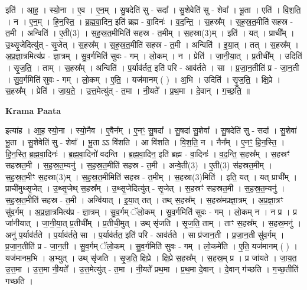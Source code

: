 \documentclass[17pt]{extarticle}
\begin{document}
इति॑ । आ॒ह॒ । स्यो॒ना । ए॒व । ए॒न॒म् । सु॒षदेति॑ सु - सदा᳚ । सु॒शेवेति॑ सु - शेवा᳚ । भू॒ता । एति॑ । वि॒श॒ति॒ । न । ए॒न॒म् । हि॒न॒स्ति॒ । ब्र॒ह्म॒वा॒दिन॒ इति॑ ब्रह्म - वा॒दिनः॑ । व॒द॒न्ति॒ । स॒हस्र᳚म् । स॒ह॒स्र॒त॒मीति॑ सहस्र - त॒मी । अन्विति॑ । ए॒ती(3) । स॒ह॒स्र॒त॒मीमिति॑ सहस्र - त॒मीम् । स॒हस्रा(3)म् । इति॑ । यत् । प्राची᳚म् । उ॒थ्सृ॒जेदित्यु॑त् - सृ॒जेत् । स॒हस्र᳚म् । स॒ह॒स्र॒त॒मीति॑ सहस्र - त॒मी । अन्विति॑ । इ॒या॒त् । तत् । स॒हस्र᳚म् । अ॒प्र॒ज्ञा॒त्रमित्य॑प्र - ज्ञा॒त्रम् । सु॒व॒र्गमिति॑ सुवः - गम् । लो॒कम् । न । प्रेति॑ । जा॒नी॒या॒त् । प्र॒तीची᳚म् । उदिति॑ । सृ॒ज॒ति॒ । ताम् । स॒हस्र᳚म् । अन्विति॑ । प॒र्याव॑र्तत॒ इति॑ परि - आव॑र्तते । सा । प्र॒जा॒न॒तीति॑ प्र - जा॒न॒ती । सु॒व॒र्गमिति॑ सुवः - गम् । लो॒कम् । ए॒ति॒ । यज॑मानम् ( ) । अ॒भि । उदिति॑ । सृ॒ज॒ति॒ । क्षि॒प्रे । स॒हस्र᳚म् । प्रेति॑ । जा॒य॒ते॒ । उ॒त्त॒मेत्यु॑त् - त॒मा । नी॒यते᳚ । प्र॒थ॒मा । दे॒वान् । ग॒च्छ॒ति॒ ॥  \newline


\textbf{Krama Paata} \newline

इत्या॑ह । आ॒ह॒ स्यो॒ना । स्यो॒नैव । ए॒वैन᳚म् । ए॒नꣳ॒॒ सु॒षदा᳚ । सु॒षदा॑ सु॒शेवा᳚ । सु॒षदेति॑ सु - सदा᳚ । सु॒शेवा॑ भू॒ता । सु॒शेवेति॑ सु - शेवा᳚ । भू॒ता ऽऽ वि॑शति । आ वि॑शति । वि॒श॒ति॒ न । नैन᳚म् । ए॒नꣳ॒॒ हि॒न॒स्ति॒ । हि॒न॒स्ति॒ ब्र॒ह्म॒वा॒दिनः॑ । ब्र॒ह्म॒वा॒दिनो॑ वदन्ति । ब्र॒ह्म॒वा॒दिन॒ इति॑ ब्रह्म - वा॒दिनः॑ । व॒द॒न्ति॒ स॒हस्र᳚म् । स॒हस्रꣳ॑ सहस्रत॒मी । स॒ह॒स्र॒त॒म्यनु॑ । स॒ह॒स्र॒त॒मीति॑ सहस्र - त॒मी । अन्वे॒ती(3) । ए॒ती(3) स॑हस्रत॒मीम् । स॒ह॒स्र॒त॒मीꣳ स॒हस्रा(3)म् । स॒ह॒स्र॒त॒मीमिति॑ सहस्र - त॒मीम् । स॒हस्रा(3)मिति॑ । इति॒ यत् । यत् प्राची᳚म् । प्राची॑मुथ्सृ॒जेत् । उ॒थ्सृ॒जेथ् स॒हस्र᳚म् । उ॒थ्सृ॒जेदित्यु॑त् - सृ॒जेत् । स॒हस्रꣳ॑ सहस्रत॒मी । स॒ह॒स्र॒त॒म्यनु॑ । स॒ह॒स्र॒त॒मीति॑ सहस्र - त॒मी । अन्वि॑यात् । इ॒या॒त् तत् । तथ् स॒हस्र᳚म् । स॒हस्र॑मप्रज्ञा॒त्रम् । अ॒प्र॒ज्ञा॒त्रꣳ सु॑व॒र्गम् । अ॒प्र॒ज्ञा॒त्रमित्य॑प्र - ज्ञा॒त्रम् । सु॒व॒र्गम् ॅलो॒कम् । सु॒व॒र्गमिति॑ सुवः - गम् । लो॒कम् न । न प्र । प्र जा॑नीयात् । जा॒नी॒या॒त् प्र॒तीची᳚म् । प्र॒तीची॒मुत् । 
उथ् सृ॑जति । सृ॒ज॒ति॒ ताम् । ताꣳ स॒हस्र᳚म् । स॒हस्र॒मनु॑ । अनु॑ प॒र्याव॑र्तते । प॒र्याव॑र्तते॒ सा । प॒र्याव॑र्तत॒ इति॑ परि - आव॑र्तते । सा प्र॑जान॒ती । प्र॒जा॒न॒ती सु॑व॒र्गम् । प्र॒जा॒न॒तीति॑ प्र - जा॒न॒ती । सु॒व॒र्गम् ॅलो॒कम् । सु॒व॒र्गमिति॑ सुवः - गम् । लो॒कमे॑ति । ए॒ति॒ यज॑मानम् ( ) । यज॑मानम॒भि । अ॒भ्युत् । उथ् सृ॑जति । सृ॒ज॒ति॒ क्षि॒प्रे । क्षि॒प्रे स॒हस्र᳚म् । स॒हस्र॒म् प्र । प्र जा॑यते । जा॒य॒त॒ उ॒त्त॒मा । उ॒त्त॒मा नी॒यते᳚ । उ॒त्त॒मेत्यु॑त् - त॒मा । नी॒यते᳚ प्रथ॒मा । प्र॒थ॒मा दे॒वान् । दे॒वान् ग॑च्छति । ग॒च्छ॒तीति॑ गच्छति । \newline
\end{document}
